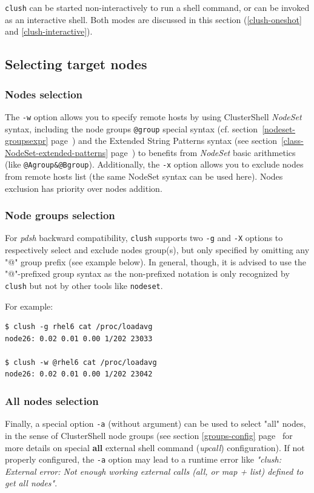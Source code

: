 \documentclass[english,a4paper]{csuserguide}
\newcommand{\NodeSet}{\textit{NodeSet}\xspace}
\newcommand{\nodeset}{\texttt{nodeset}\xspace}
\newcommand{\clush}{\texttt{clush}\xspace}
\begin{document}
\clush  can be started non-interactively to run a shell command, or can be invoked as an interactive shell. Both modes are discussed in this section (\ref{clush-oneshot} and \ref{clush-interactive}).

\subsection{Selecting target nodes}

\subsubsection{Nodes selection}

The \verb+-w+ option allows you to specify remote hosts by using ClusterShell \NodeSet syntax, including the node groups \lstinline{@group} special syntax (cf. section~\ref{nodeset-groupsexpr} page~\pageref{nodeset-groupsexpr}) and the Extended String Patterns syntax (see section~\ref{class-NodeSet-extended-patterns} page~\pageref{class-NodeSet-extended-patterns}) to benefits from \NodeSet basic arithmetics (like \lstinline{@Agroup&@Bgroup}). Additionally, the \verb+-x+ option allows you to exclude nodes from remote hosts list (the same NodeSet syntax can be used here). Nodes exclusion has priority over nodes addition.

\subsubsection{Node groups selection}
For \textit{pdsh} backward compatibility, \clush supports two \verb+-g+ and \verb+-X+ options to respectively select and exclude nodes group(s), but only specified by omitting any "@" group prefix (see example below). In general, though, it is advised to use the "@"-prefixed group syntax as the non-prefixed notation is only recognized by \clush but not by other tools like \nodeset.

\bigskip
\pagebreak[2]

For example:
\begin{lstlisting}[breaklines=true, breakatwhitespace=true]
$ clush -g rhel6 cat /proc/loadavg
node26: 0.02 0.01 0.00 1/202 23033

$ clush -w @rhel6 cat /proc/loadavg
node26: 0.02 0.01 0.00 1/202 23042
\end{lstlisting}

\subsubsection{All nodes selection}
Finally, a special option \verb+-a+ (without argument) can be used to select "all" nodes, in the sense of ClusterShell node groups (see section \ref{groups-config} page~\pageref{groups-config} for more details on special \textbf{all} external shell command (\textit{upcall}) configuration). If not properly configured, the \verb+-a+ option may lead to a runtime error like \textit{"clush: External error: Not enough working external calls (all, or map + list) defined to get all nodes"}.
\end{document}
